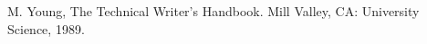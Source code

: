 \begin{thebibliography}{00}
 M. Young, The Technical Writer's Handbook. Mill Valley, CA: University Science, 1989. %
\end{thebibliography}
